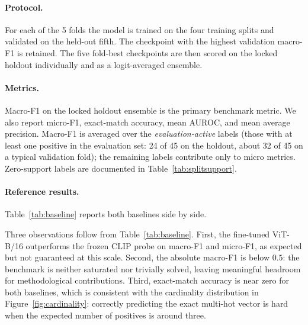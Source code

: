 \documentclass[11pt,a4paper]{article}
\begin{document}
\paragraph{Protocol.} For each of the 5 folds the model is trained
on the four training splits and validated on the held-out fifth.
The checkpoint with the highest validation macro-F1 is retained.
The five fold-best checkpoints are then scored on the locked
holdout individually and as a logit-averaged ensemble.

\paragraph{Metrics.} Macro-F1 on the locked holdout ensemble is the
primary benchmark metric. We also report micro-F1, exact-match
accuracy, mean AUROC, and mean average precision. Macro-F1 is
averaged over the \emph{evaluation-active} labels (those with at
least one positive in the evaluation set: 24 of 45 on the holdout,
about 32 of 45 on a typical validation fold); the remaining labels
contribute only to micro metrics. Zero-support labels are
documented in Table~\ref{tab:splitsupport}.

\paragraph{Reference results.}
Table~\ref{tab:baseline} reports both baselines side by side.

\begin{table}[t]
\centering
\caption{Reference baselines on G3 Corfu Butterflies. The frozen
CLIP linear probe establishes the out-of-the-box foundation-model
number; the fine-tuned ViT-B/16 improves macro-F1 by $+10.4$
($+8.6$) points on cross-validation (holdout ensemble),
demonstrating that the benchmark rewards representation learning
beyond a frozen probe.}
\label{tab:baseline}

\end{table}

Three observations follow from Table~\ref{tab:baseline}. First, the
fine-tuned ViT-B/16 outperforms the frozen CLIP probe on macro-F1
and micro-F1, as expected but not guaranteed at this scale. Second,
the absolute macro-F1 is below $0.5$: the benchmark is neither
saturated nor trivially solved, leaving meaningful headroom for
methodological contributions. Third, exact-match accuracy is near
zero for both baselines, which is consistent with the cardinality
distribution in Figure~\ref{fig:cardinality}: correctly predicting
the exact multi-hot vector is hard when the expected number of
positives is around three.
\end{document}
